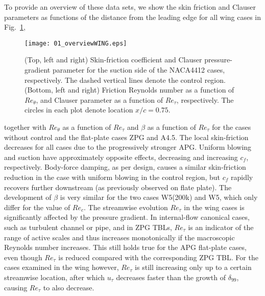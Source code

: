 To provide an overview of these data sets, we show the skin friction and Clauser parameters as functions of the distance from the leading edge for all wing cases in Fig.~\ref{fig:overviewWIGN2},
\begin{figure}
\centering
\texttt{[image: 01\_overviewWING.eps]}\caption{\label{fig:overviewWIGN2} (Top, left and right) Skin-friction coefficient and Clauser pressure-gradient parameter for the suction side of the NACA4412 cases, respectively. The dashed vertical lines denote the control region. (Bottom, left and right) Friction Reynolds number as a function of $Re_\theta$, and Clauser parameter as a function of $Re_\tau$, respectively. The circles in each plot denote location $x/c=0.75$.}
\end{figure}
together with $Re_\theta$ as a function of $Re_\tau$ and $\beta$ as a function of $Re_\tau$ for the cases without control and the flat-plate cases ZPG and A4.5. The local skin-friction decreases for all cases due to the progressively stronger APG. Uniform blowing and suction have approximately opposite effects, decreasing and increasing $c_f$, respectively. Body-force damping, as per design, causes a similar skin-friction reduction in the case with uniform blowing in the control region, but $c_f$ rapidly recovers further downstream (as previously observed on flate plate\cite{stro16}). The development of $\beta$ is very similar for the two cases W5(200k) and W5, which only differ for the value of $Re_c$. The streamwise evolution $Re_\tau$ in the wing cases is significantly affected by the pressure gradient. In internal-flow canonical cases, such as turbulent channel or pipe, and in ZPG TBLs, $Re_\tau$ is an indicator of the range of active scales and thus increases monotonically if the macroscopic Reynolds number increases. This still holds true for the APG flat-plate cases, even though $Re_\tau$ is reduced compared with the corresponding ZPG TBL. For the cases examined in the wing however, $Re_\tau$ is still increasing only up to a certain streamwise location, after which $u_\tau$ decreases faster than the growth of $\delta_{99}$, causing $Re_\tau$ to also decrease. 
 

